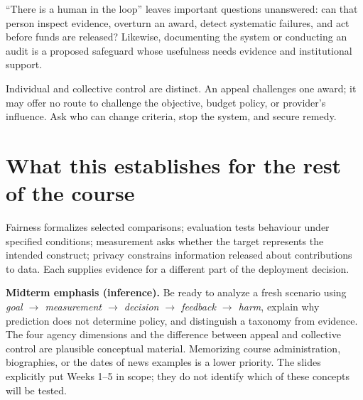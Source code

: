 \documentclass[11pt,letterpaper]{article}
\begin{document}
``There is a human in the loop'' leaves important questions unanswered: can that
person inspect evidence, overturn an award, detect systematic failures, and act
before funds are released? Likewise, documenting the system or conducting an audit
is a proposed safeguard whose usefulness needs evidence and institutional support.

Individual and collective control are distinct. An appeal challenges one award;
it may offer no route to challenge the objective, budget policy, or provider's
influence. Ask who can change criteria, stop the system, and secure remedy.

\section*{What this establishes for the rest of the course}
Fairness formalizes selected comparisons; evaluation tests behaviour under
specified conditions; measurement asks whether the target represents the intended
construct; privacy constrains information released about contributions to data.
Each supplies evidence for a different part of the deployment decision.

\textbf{Midterm emphasis (inference).} Be ready to analyze a fresh scenario using
\emph{goal $\to$ measurement $\to$ decision $\to$ feedback $\to$ harm}, explain
why prediction does not determine policy, and distinguish a taxonomy from evidence.
The four agency dimensions and the difference between appeal and collective control
are plausible conceptual material. Memorizing course administration, biographies,
or the dates of news examples is a lower priority. The slides explicitly put
Weeks 1--5 in scope; they do not identify which of these concepts will be tested.

\end{document}
